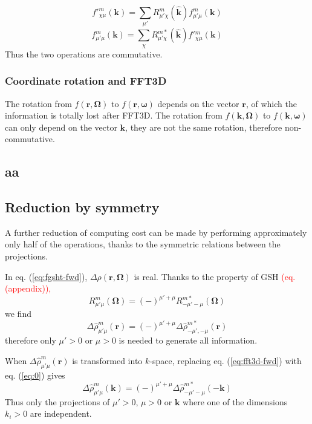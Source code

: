 \[
f'_{\chi\mu}^{m}(\mathbf{k})=\sum_{\mu'}R_{\mu'\chi}^{m}(\hat{\mathbf{k}})f_{\mu'\mu}^{m}(\mathbf{k})
\]
\[
f_{\mu'\mu}^{m}(\mathbf{k})=\sum_{\chi}R_{\mu'\chi}^{m*}(\hat{\mathbf{k}})f'{}_{\chi\mu}^{m}(\mathbf{k})
\]
Thus the two operations are commutative.

\subsubsection{Coordinate rotation and FFT3D}

The rotation from $f(\mathbf{r},\mathbf{\Omega})$ to $f(\mathbf{r},\boldsymbol{\omega})$
depends on the vector $\mathbf{r}$, of which the information is totally
lost after FFT3D. The rotation from $f(\mathbf{k},\mathbf{\Omega})$
to $f(\mathbf{k},\boldsymbol{\omega})$ can only depend on the vector
$\mathbf{k}$, they are not the same rotation, therefore non-commutative. 

\subsection{aa}

\subsection{Reduction by symmetry\label{subsec:Reduction-by-symmetry}}

A further reduction of computing cost can be made by performing approximately
only half of the operations, thanks to the symmetric relations between
the projections.

In eq. (\ref{eq:fgsht-fwd}), $\Delta\rho(\mathbf{r},\mathbf{\Omega})$
is real. Thanks to the property of \acs{GSH} \textcolor{red}{(eq.
(appendix)),}
\[
R_{\mu'\mu}^{m}(\mathbf{\Omega})=(-)^{\mu'+\mu}R_{-\mu'-\mu}^{m*}(\mathbf{\Omega})
\]
we find
\begin{equation}
\Delta\hat{\rho}_{\mu'\mu}^{m}(\mathbf{r})=(-)^{\mu'+\mu}\Delta\hat{\rho}_{-\mu',-\mu}^{m*}(\mathbf{r})\label{eq:0}
\end{equation}
therefore only $\mu'>0$ or $\mu>0$ is needed to generate all information.

When $\Delta\hat{\rho}_{\mu'\mu}^{m}(\mathbf{r})$ is transformed
into $k$-space, replacing eq. (\ref{eq:fft3d-fwd}) with eq. (\ref{eq:0})
gives
\begin{equation}
\Delta\hat{\rho}_{\mu'\mu}^{m}(\mathbf{k})=(-)^{\mu'+\mu}\Delta\hat{\rho}_{-\mu'-\mu}^{m*}(-\mathbf{k})\label{eq:1}
\end{equation}
Thus only the projections of $\mu'>0$, $\mu>0$ or $\mathbf{k}$
where one of the dimensions $k_{i}>0$ are independent.

